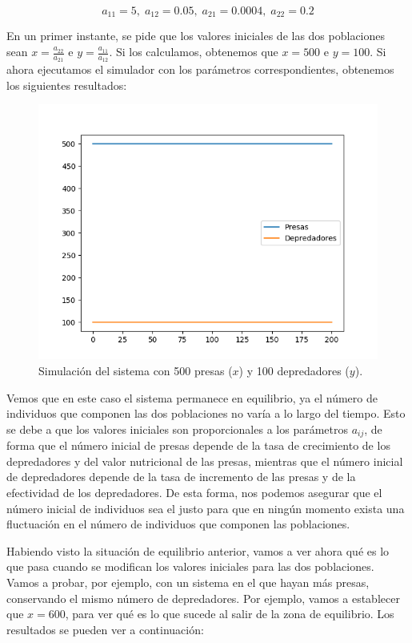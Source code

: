 \documentclass[11pt,a4paper]{article}
\begin{document}
$$
	a_{11} = 5, \; a_{12} = 0.05, \; a_{21} = 0.0004, \; a_{22} = 0.2
$$

En un primer instante, se pide que los valores iniciales de las dos poblaciones
sean $x = \frac{a_{22}}{a_{21}}$ e $y = \frac{a_{11}}{a_{12}}$. Si los calculamos,
obtenemos que $x = 500$ e $y = 100$. Si ahora ejecutamos el simulador con los parámetros
correspondientes, obtenemos los siguientes resultados:

\begin{figure}[H]
	\centering
	\includegraphics[scale=0.6]{img/x500y100}
	\caption{Simulación del sistema con 500 presas ($x$) y 100 depredadores ($y$).}
\end{figure}

Vemos que en este caso el sistema permanece en equilibrio, ya el número de individuos
que componen las dos poblaciones no varía a lo largo del tiempo. Esto se debe a que
los valores iniciales son proporcionales a los parámetros $a_{ij}$, de forma que
el número inicial de presas depende de la tasa de crecimiento de los depredadores
y del valor nutricional de las presas, mientras que el número inicial de depredadores
depende de la tasa de incremento de las presas y de la efectividad de los depredadores.
De esta forma, nos podemos asegurar que el número inicial de individuos sea el justo para
que en ningún momento exista una fluctuación en el número de individuos que componen las
poblaciones.

Habiendo visto la situación de equilibrio anterior, vamos a ver ahora qué es lo que pasa
cuando se modifican los valores iniciales para las dos poblaciones. Vamos a probar, por ejemplo,
con un sistema en el que hayan más presas, conservando el mismo número de depredadores.
Por ejemplo, vamos a establecer que $x = 600$, para ver qué es lo que sucede al salir de la
zona de equilibrio. Los resultados se pueden ver a continuación:
\end{document}
